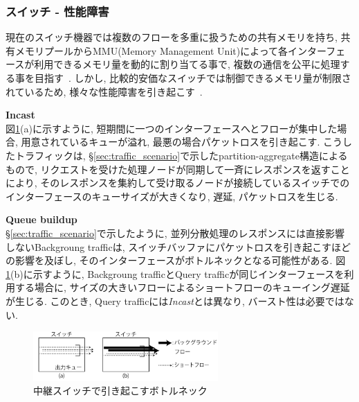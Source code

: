 \subsubsection{スイッチ - 性能障害}
現在のスイッチ機器では複数のフローを多重に扱うための共有メモリを持ち, 共有メモリプールからMMU(Memory Management
Unit)によって各インターフェースが利用できるメモリ量を動的に割り当てる事で, 複数の通信を公平に処理する事を目指す~\cite{flexible}.
しかし, 比較的安価なスイッチでは制御できるメモリ量が制限されているため,
様々な性能障害を引き起こす~\cite{flexible}.

{\bf Incast}\\
\label{subsec:incast}
図\ref{fig:impair}(a)に示すように, 短期間に一つのインターフェースへとフローが集中した場合, 用意されているキューが溢れ,
最悪の場合パケットロスを引き起こす.
こうしたトラフィックは, \S \ref{sec:traffic_scenario}で示したpartition-aggregate構造によるもので,
リクエストを受けた処理ノードが同期して一斉にレスポンスを返すことにより,
そのレスポンスを集約して受け取るノードが接続しているスイッチでのインターフェースのキューサイズが大きくなり, 遅延, パケットロスを生じる.

{\bf Queue buildup}\\
\label{subsec:queue}
\S \ref{sec:traffic_scenario}で示したように, 並列分散処理のレスポンスには直接影響しないBackgroung trafficは,
スイッチバッファにパケットロスを引き起こすほどの影響を及ぼし, そのインターフェースがボトルネックとなる可能性がある.
図\ref{fig:impair}(b)に示すように, Backgroung trafficとQuery trafficが同じインターフェースを利用する場合に,
サイズの大きいフローによるショートフローのキューイング遅延が生じる.
このとき, Query trafficには{\it Incast}とは異なり, バースト性は必要ではない.

\begin{figure}[t]
    \begin{center}
    \includegraphics[autoebb, width=200pt]{./img/impairments.pdf}
    \caption{中継スイッチで引き起こすボトルネック}
    \label{fig:impair}
    \end{center}
\end{figure}


